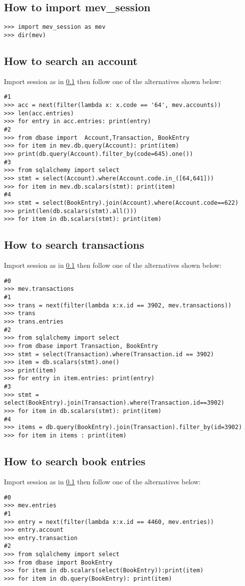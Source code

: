 \documentclass[12pt, a4paper]{article}
\begin{document}
\subsection{How to import mev\_session} \label{MEV_session}
\begin{verbatim}
>>> import mev_session as mev
>>> dir(mev)
\end{verbatim}

\subsection{How to search an account } \label{DB_search_account}
Import session as in \ref{MEV_session} then follow one of the alternatives shown below:
\begin{verbatim}
#1
>>> acc = next(filter(lambda x: x.code == '64', mev.accounts))
>>> len(acc.entries)
>>> for entry in acc.entries: print(entry)
#2
>>> from dbase import  Account,Transaction, BookEntry	
>>> for item in mev.db.query(Account): print(item)
>>> print(db.query(Account).filter_by(code=645).one())
#3
>>> from sqlalchemy import select
>>> stmt = select(Account).where(Account.code.in_([64,641]))
>>> for item in mev.db.scalars(stmt): print(item)
#4
>>> stmt = select(BookEntry).join(Account).where(Account.code==622)
>>> print(len(db.scalars(stmt).all()))
>>> for item in db.scalars(stmt): print(item)

\end{verbatim}

\subsection{How to search transactions}\label{DB_search_transaction}
Import session as in \ref{MEV_session} then follow one of the alternatives shown below:
\begin{verbatim}
#0
>>> mev.transactions
#1
>>> trans = next(filter(lambda x:x.id == 3902, mev.transactions))
>>> trans
>>> trans.entries
#2
>>> from sqlalchemy import select
>>> from dbase import Transaction, BookEntry
>>> stmt = select(Transaction).where(Transaction.id == 3902)
>>> item = db.scalars(stmt).one()
>>> print(item)
>>> for entry in item.entries: print(entry)
#3
>>> stmt = select(BookEntry).join(Transaction).where(Transaction.id==3902)
>>> for item in db.scalars(stmt): print(item)
#4
>>> items = db.query(BookEntry).join(Transaction).filter_by(id=3902)
>>> for item in items : print(item)
\end{verbatim}

\subsection{How to search  book entries} \label{DB_search_entries}
Import session as in \ref{MEV_session} then follow one of the alternatives below:
\begin{verbatim}
#0
>>> mev.entries
#1
>>> entry = next(filter(lambda x:x.id == 4460, mev.entries))
>>> entry.account	
>>> entry.transaction
#2
>>> from sqlalchemy import select
>>> from dbase import BookEntry
>>> for item in db.scalars(select(BookEntry)):print(item)
>>> for item in db.query(BookEntry): print(item)
\end{verbatim}
\end{document}
